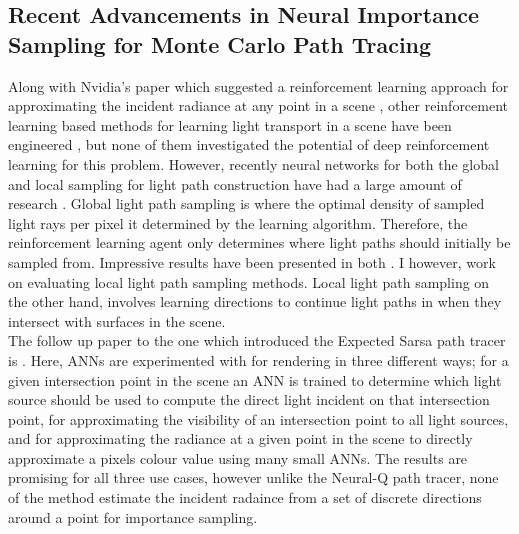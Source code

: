 \documentclass[../dissertation.tex]{subfiles}
\begin{document}
\subsection{Recent Advancements in Neural Importance Sampling for Monte Carlo Path Tracing}

Along with Nvidia's paper which suggested a reinforcement learning approach for approximating the incident radiance at any point in a scene \cite{dahm2017learning}, other reinforcement learning based methods for learning light transport in a scene have been engineered \cite{muller2017practical, vorba2014line}, but none of them investigated the potential of deep reinforcement learning for this problem. However, recently neural networks for both the global and local sampling for light path construction have had a large amount of research \cite{zheng2018learning, muller2018neural, keller2019integral, hermosilla2018deep}. Global light path sampling is where the optimal density of sampled light rays per pixel it determined by the learning algorithm. Therefore, the reinforcement learning agent only determines where light paths should initially be sampled from. Impressive results have been presented in both \cite{muller2017practical, zheng2018learning}. I however, work on evaluating local light path sampling methods. Local light path sampling on the other hand, involves learning directions to continue light paths in when they intersect with surfaces in the scene.\\

 The follow up paper to the one which introduced the Expected Sarsa path tracer \cite{dahm2017learning} is \cite{keller2019integral}. Here, ANNs are experimented with for rendering in three different ways; for a given intersection point in the scene an ANN is trained to determine which light source should be used to compute the direct light incident on that intersection point, for approximating the visibility of an intersection point to all light sources, and for approximating the radiance at a given point in the scene to directly approximate a pixels colour value using many small ANNs. The results are promising for all three use cases, however unlike the Neural-Q path tracer, none of the method estimate the incident radaince from a set of discrete directions around a point for importance sampling.\\
 
\end{document}
